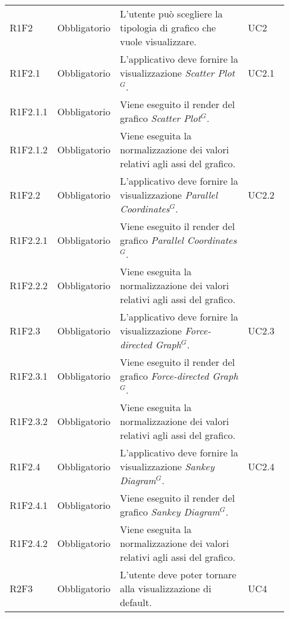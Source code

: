 {\begin{longtable}{p{0.12\linewidth}p{0.15\linewidth}p{0.50\linewidth}p{0.15\linewidth}}
    \rowcolor[RGB]{216, 235, 171}
    R1F2 & Obbligatorio & L'utente può scegliere la tipologia di grafico che vuole visualizzare. & UC2\\
    \rowcolor[RGB]{233, 245, 206}
    R1F2.1 & Obbligatorio & L'applicativo deve fornire la visualizzazione \textit{Scatter Plot$^{G}$}. & UC2.1\\
    \rowcolor[RGB]{216, 235, 171}
    R1F2.1.1 & Obbligatorio & Viene eseguito il render del grafico \textit{Scatter Plot$^{G}$}. & \\
    \rowcolor[RGB]{233, 245, 206}
    R1F2.1.2 & Obbligatorio & Viene eseguita la normalizzazione dei valori relativi agli assi del grafico. & \\
    \rowcolor[RGB]{216, 235, 171}
    R1F2.2 & Obbligatorio & L'applicativo deve fornire la visualizzazione \textit{Parallel Coordinates$^{G}$}. & UC2.2\\
    \rowcolor[RGB]{233, 245, 206}
    R1F2.2.1 & Obbligatorio & Viene eseguito il render del grafico \textit{Parallel Coordinates$^{G}$}. & \\
    \rowcolor[RGB]{216, 235, 171}
    R1F2.2.2 & Obbligatorio & Viene eseguita la normalizzazione dei valori relativi agli assi del grafico. & \\
    \rowcolor[RGB]{233, 245, 206}
    R1F2.3 & Obbligatorio & L'applicativo deve fornire la visualizzazione \textit{Force-directed Graph$^{G}$}. & UC2.3\\
    \rowcolor[RGB]{216, 235, 171}
    R1F2.3.1 & Obbligatorio & Viene eseguito il render del grafico \textit{Force-directed Graph$^{G}$}. & \\
    \rowcolor[RGB]{233, 245, 206}
    R1F2.3.2 & Obbligatorio & Viene eseguita la normalizzazione dei valori relativi agli assi del grafico. & \\
    \rowcolor[RGB]{216, 235, 171}
    R1F2.4 & Obbligatorio & L'applicativo deve fornire la visualizzazione \textit{Sankey Diagram$^{G}$}. & UC2.4\\
    \rowcolor[RGB]{233, 245, 206}
    R1F2.4.1 & Obbligatorio & Viene eseguito il render del grafico \textit{Sankey Diagram$^{G}$}. & \\
    \rowcolor[RGB]{216, 235, 171}
    R1F2.4.2 & Obbligatorio & Viene eseguita la normalizzazione dei valori relativi agli assi del grafico. & \\


    \rowcolor[RGB]{233, 245, 206}
    R2F3 & Obbligatorio & L'utente deve poter tornare alla visualizzazione di default. & UC4\\
    

\end{longtable}}
